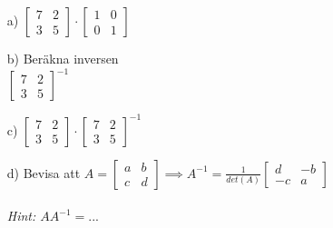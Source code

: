 \begin{itemize}
    \item[a) ]	
				$ 
    			\begin{bmatrix}
    			7  & 2 \\
    			3  & 5
    			\end{bmatrix}
    			\cdot
    			\begin{bmatrix}
    			1 & 0  \\
    			0 & 1
    			\end{bmatrix}
    			$
    			
    \item[b) ]	Beräkna inversen 
    			\newline
    			\\
    			$ 
    			\begin{bmatrix}
    			7  & 2 \\
    			3  & 5
    			\end{bmatrix}
				^{-1}
    			$
    			
    \item[c) ]	
    			$ 
    			\begin{bmatrix}
    			7  & 2 \\
    			3  & 5
    			\end{bmatrix}
    			\cdot
    			\begin{bmatrix}
    			7  & 2 \\
    			3  & 5
    			\end{bmatrix}
				^{-1}
    			$
    			
    \item[d) ]	Bevisa att
    			$ 
    			A = 
    			\begin{bmatrix}
    			a  & b \\
    			c  & d
    			\end{bmatrix}  
    			\implies
    			A^{-1} = 
    			\frac{1}{det(A)}
    			\begin{bmatrix}
    			d  & -b \\
    			-c & a
    			\end{bmatrix}		
    			$
    			\\
    			\\
    			\it{Hint: $A A^{-1} = ... $}
\end{itemize}